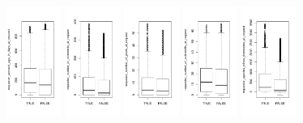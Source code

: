 \begin{figure}
	\includegraphics[width=0.16\textwidth]{data/requester_account_age_in_days_at_request}
	\includegraphics[width=0.16\textwidth]{data/requester_number_of_comments_at_request}
	\includegraphics[width=0.16\textwidth]{data/requester_number_of_posts_at_request}
	\includegraphics[width=0.16\textwidth]{data/requester_number_of_subreddits_at_request}
	\includegraphics[width=0.16\textwidth]{data/requester_upvotes_minus_downvotes_at_request}

\end{figure}
